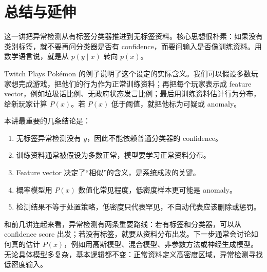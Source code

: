 \documentclass[a4paper]{article}
\begin{document}
\section{总结与延伸}

这一讲把异常检测从有标签分类器推进到无标签资料。核心思想很朴素：如果没有类别标签，就不要再问分类器是否有 confidence，而要问输入是否像训练资料。用数学语言说，就是从 $p(y\mid x)$ 转向 $p(x)$。

Twitch Plays Pokémon 的例子说明了这个设定的实际含义。我们可以假设多数玩家想完成游戏，把他们的行为作为正常训练资料；再把每个玩家表示成 feature vector，例如垃圾话比例、无政府状态发言比例；最后用训练资料估计行为分布，给新玩家计算 $P(x)$。若 $P(x)$ 低于阈值，就把他标为可疑或 anomaly。

本讲最重要的几条结论是：
\begin{enumerate}
    \item 无标签异常检测没有 $y$，因此不能依赖普通分类器的 confidence。
    \item 训练资料通常被假设为多数正常，模型要学习正常资料分布。
    \item Feature vector 决定了“相似”的含义，是系统成败的关键。
    \item 概率模型用 $P(x)$ 数值化常见程度，低密度样本更可能是 anomaly。
    \item 检测结果不等于处置策略，低密度只代表罕见，不自动代表应该删除或惩罚。
\end{enumerate}

和前几讲连起来看，异常检测有两条重要路线：若有标签和分类器，可以从 confidence score 出发；若没有标签，就要从资料分布出发。下一步通常会讨论如何真的估计 $P(x)$，例如用高斯模型、混合模型、非参数方法或神经生成模型。无论具体模型多复杂，基本逻辑都不变：正常资料定义高密度区域，异常检测寻找低密度输入。
\end{document}
